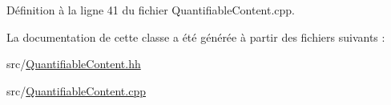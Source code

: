 Définition à la ligne 41 du fichier QuantifiableContent.cpp.



La documentation de cette classe a été générée à partir des fichiers suivants :\begin{DoxyCompactItemize}
\item 
src/\hyperlink{_quantifiable_content_8hh}{QuantifiableContent.hh}\item 
src/\hyperlink{_quantifiable_content_8cpp}{QuantifiableContent.cpp}\end{DoxyCompactItemize}
